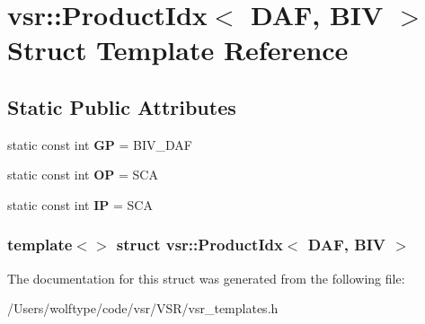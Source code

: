 \hypertarget{structvsr_1_1_product_idx_3_01_d_a_f_00_01_b_i_v_01_4}{\section{vsr\-:\-:Product\-Idx$<$ D\-A\-F, B\-I\-V $>$ Struct Template Reference}
\label{structvsr_1_1_product_idx_3_01_d_a_f_00_01_b_i_v_01_4}
}
\subsection*{Static Public Attributes}
\begin{DoxyCompactItemize}
\item 
\hypertarget{structvsr_1_1_product_idx_3_01_d_a_f_00_01_b_i_v_01_4_a6b6699a98902a6b0ba2de224fa482415}{static const int {\bfseries G\-P} = B\-I\-V\-\_\-\-D\-A\-F}\label{structvsr_1_1_product_idx_3_01_d_a_f_00_01_b_i_v_01_4_a6b6699a98902a6b0ba2de224fa482415}

\item 
\hypertarget{structvsr_1_1_product_idx_3_01_d_a_f_00_01_b_i_v_01_4_a80597f7a9a599c573f575ffb01c1b0c6}{static const int {\bfseries O\-P} = S\-C\-A}\label{structvsr_1_1_product_idx_3_01_d_a_f_00_01_b_i_v_01_4_a80597f7a9a599c573f575ffb01c1b0c6}

\item 
\hypertarget{structvsr_1_1_product_idx_3_01_d_a_f_00_01_b_i_v_01_4_ad885073af297504123fee234af6ddb3c}{static const int {\bfseries I\-P} = S\-C\-A}\label{structvsr_1_1_product_idx_3_01_d_a_f_00_01_b_i_v_01_4_ad885073af297504123fee234af6ddb3c}

\end{DoxyCompactItemize}
\subsubsection*{template$<$$>$ struct vsr\-::\-Product\-Idx$<$ D\-A\-F, B\-I\-V $>$}



The documentation for this struct was generated from the following file\-:\begin{DoxyCompactItemize}
\item 
/\-Users/wolftype/code/vsr/\-V\-S\-R/vsr\-\_\-templates.\-h\end{DoxyCompactItemize}
